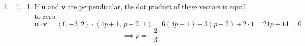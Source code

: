 \documentclass[a4paper, 12pt]{article}
\begin{document}
\begin{enumerate}[leftmargin=*,label=\textbf{\arabic*.}]
\begin{enumerate}[leftmargin=*,label=\textbf{\alph*.}]
\item Rearrange the equation.
\[r=\tan\theta\sec\theta=\frac{\sin\theta}{\cos^2\theta}\implies r\cos^2\theta=\sin\theta\implies r^2\cos^2\theta=r\sin\theta\]

Using the equations $x=r\cos\theta$ and $y=r\sin\theta$, we get the parabola $x^2=y$, where its branches open upward along the $y$-axis with the vertex $(0,0)$.
\begin{center}
\end{center}

\end{enumerate}

\item \begin{enumerate}[leftmargin=*,label=\textbf{\alph*.}]
\item \begin{enumerate}[leftmargin=*,label=\textbf{\roman*.}]
\item If $\mathbf u$ and $\mathbf v$ are perpendicular, the dot product of these vectors is equal to zero.
\[\mathbf u\cdot\mathbf v=\left\langle6,-3,2\right\rangle\cdot\left\langle4p+1,\,p-2,\,1\right\rangle=6(4p+1)-3(p-2)+2\cdot1=21p+14=0\]
\[\implies \boxed{p=-\frac23}\]


\end{enumerate}
\end{enumerate}
\end{enumerate}
\end{document}
